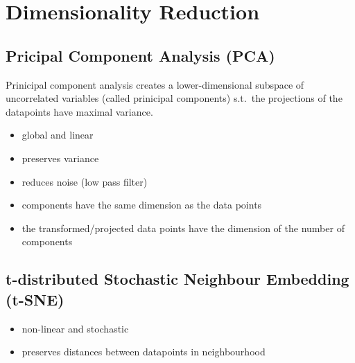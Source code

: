 \section{Dimensionality Reduction}

\subsection{Pricipal Component Analysis (PCA)}
Prinicipal component analysis creates a lower-dimensional subspace of uncorrelated variables (called prinicipal components) s.t.\ the projections of the datapoints have maximal variance.

\newpar{}
\begin{itemize}
    \item global and linear
    \item preserves variance
    \item reduces noise (low pass filter)
    \item components have the same dimension as the data points
    \item the transformed/projected data points have the dimension of the number of components
\end{itemize}

\newpar{}

\subsection{t-distributed Stochastic Neighbour Embedding (t-SNE)}
\begin{itemize}
    \item non-linear and stochastic
    \item preserves distances between datapoints in neighbourhood
\end{itemize}